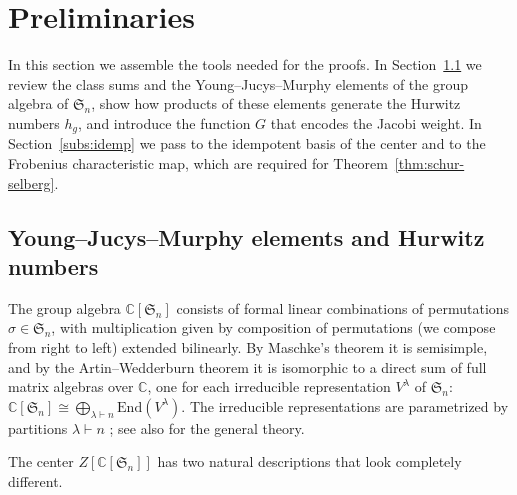 \documentclass{article}
\theoremstyle{plain}
\theoremstyle{definition}
\numberwithin{equation}{section}
\begin{document}
\section{Preliminaries}
\label{sec:prelim}

In this section we assemble the tools needed for the proofs. In Section~\ref{subs:yjm} we review
the class sums and the Young--Jucys--Murphy elements of the group algebra of $\mathfrak S_n$,
show how products of these elements generate the Hurwitz numbers $h_g$, and introduce the
function $G$ that encodes the Jacobi weight. In Section~\ref{subs:idemp} we pass to the
idempotent basis of the center and to the Frobenius characteristic map, which are required
for Theorem~\ref{thm:schur-selberg}.

\subsection{Young–Jucys–Murphy elements and Hurwitz numbers}
\label{subs:yjm}

The group algebra $\mathbb{C}[\mathfrak{S}_n]$ consists of formal linear combinations of
permutations $\sigma\in\mathfrak{S}_n$, with multiplication given by composition of
permutations (we compose from right to left) extended bilinearly. By Maschke's theorem
\cite{Maschke1899} it is semisimple, and by the Artin--Wedderburn theorem
\cite{Wedderburn1908,Artin1927} it is isomorphic to a direct sum of full matrix algebras
over $\mathbb{C}$, one for each irreducible representation $V^\lambda$ of $\mathfrak{S}_n$:
$\mathbb{C}[\mathfrak{S}_n]\cong\bigoplus_{\lambda\vdash n}\mathrm{End}(V^\lambda)$.
The irreducible representations are parametrized by partitions $\lambda\vdash n$
\cite{Frobenius1900,Specht1935}; see also \cite[Ch.~6]{Serre} for the general theory.

The center $Z[\mathbb C[\mathfrak S_n]]$ has two natural descriptions that look completely different.
\end{document}
